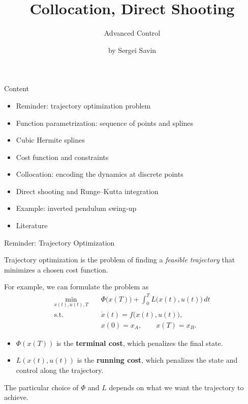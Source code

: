 \documentclass{beamer}
\title{Collocation, Direct Shooting}
\subtitle{Advanced Control}
\author{by Sergei Savin}
\date{\mydate}
\begin{document}
\maketitle


\begin{frame}{Content}
	\begin{itemize}
		\item Reminder: trajectory optimization problem
		\item Function parametrization: sequence of points and splines
		\item Cubic Hermite splines
		\item Cost function and constraints
		\item Collocation: encoding the dynamics at discrete points
		\item Direct shooting and Runge--Kutta integration
		\item Example: inverted pendulum swing-up
		\item Literature
	\end{itemize}
\end{frame}




\begin{frame}{Reminder: Trajectory Optimization}
	\begin{flushleft}
		Trajectory optimization is the problem of finding a
		\emph{feasible trajectory} that minimizes a chosen
		cost function.
		
		\vspace{0.5em}
		
		For example, we can formulate the problem as
		\[
		\begin{aligned}
			\min_{x(t),u(t),T}\quad
			&
			\Phi\bigl(x(T)\bigr)
			+
			\int_0^T L\bigl(x(t),u(t)\bigr)\,dt
			\\
			\text{s.t.}\quad
			&
			\dot{x}(t)=f\bigl(x(t),u(t)\bigr),
			\\
			&
			x(0)=x_A,
			\qquad
			x(T)=x_B.
		\end{aligned}
		\]
		
		\begin{itemize}
			\item $\Phi(x(T))$ is the \textbf{terminal cost}, which
			penalizes the final state.
			
			\item $L(x(t),u(t))$ is the \textbf{running cost}, which
			penalizes the state and control along the trajectory.
		\end{itemize}
		
		The particular choice of $\Phi$ and $L$ depends on what
		we want the trajectory to achieve.
	\end{flushleft}
\end{frame}
\end{document}
